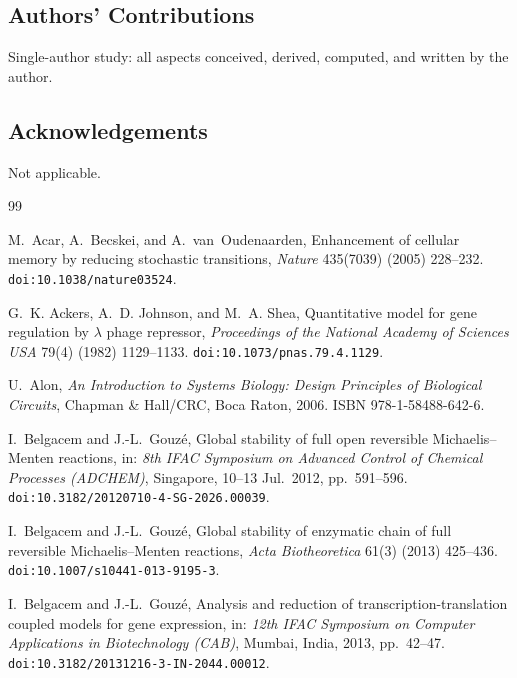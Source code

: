 \documentclass[12pt]{article}
\begin{document}
\subsection*{Authors' Contributions}
Single-author study: all aspects conceived, derived, computed, and written by the
author.

\subsection*{Acknowledgements}
Not applicable.



\begin{thebibliography}{99}

M.~Acar, A.~Becskei, and A.~van~Oudenaarden,
\newblock Enhancement of cellular memory by reducing stochastic transitions,
\newblock \emph{Nature} 435(7039) (2005) 228--232.
\newblock \texttt{doi:10.1038/nature03524}.

G.~K. Ackers, A.~D. Johnson, and M.~A. Shea,
\newblock Quantitative model for gene regulation by $\lambda$ phage repressor,
\newblock \emph{Proceedings of the National Academy of Sciences USA} 79(4) (1982)
  1129--1133.
\newblock \texttt{doi:10.1073/pnas.79.4.1129}.

U.~Alon,
\newblock \emph{An Introduction to Systems Biology: Design Principles of Biological
  Circuits},
\newblock Chapman \& Hall/CRC, Boca Raton, 2006.
\newblock ISBN 978-1-58488-642-6.

I.~Belgacem and J.-L.~Gouz\'e,
\newblock Global stability of full open reversible {M}ichaelis--{M}enten reactions,
\newblock in: \emph{8th IFAC Symposium on Advanced Control of Chemical Processes
  (ADCHEM)}, Singapore, 10--13 Jul.\ 2012, pp.\ 591--596.
\newblock \texttt{doi:10.3182/20120710-4-SG-2026.00039}.

I.~Belgacem and J.-L.~Gouz\'e,
\newblock Global stability of enzymatic chain of full reversible
  {M}ichaelis--{M}enten reactions,
\newblock \emph{Acta Biotheoretica} 61(3) (2013) 425--436.
\newblock \texttt{doi:10.1007/s10441-013-9195-3}.

I.~Belgacem and J.-L.~Gouz\'e,
\newblock Analysis and reduction of transcription-translation coupled models for
  gene expression,
\newblock in: \emph{12th IFAC Symposium on Computer Applications in Biotechnology
  (CAB)}, Mumbai, India, 2013, pp.\ 42--47.
\newblock \texttt{doi:10.3182/20131216-3-IN-2044.00012}.


\end{thebibliography}
\end{document}
